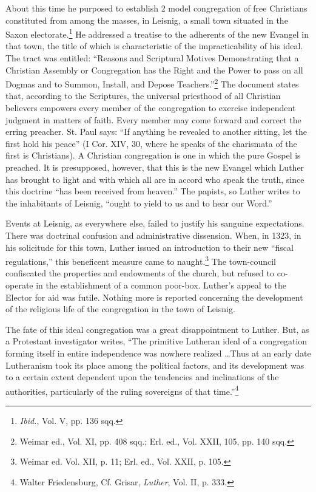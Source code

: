 About this time he purposed to establish 2 model congregation of free
Christians constituted from among the masses, in Leisnig, a small town situated
in the Saxon electorate.\footnote{\textit{Ibid.}, Vol. V, pp. 136 sqq.}
He addressed a treatise to the adherents of
the new Evangel in that town, the title of which is characteristic of the
impracticability of his ideal. The tract was entitled: “Reasons and Scriptural
Motives Demonstrating that a Christian Assembly or Congregation has the
Right and the Power to pass on all Dogmas and to Summon, Install, and
Depose Teachers.”\footnote{Weimar ed., Vol. XI, pp. 408 sqq.; Erl. ed., Vol. XXII, 105, pp. 140 sqq.}
The document states that, according to the Scriptures,
the universal priesthood of all Christian believers empowers every member
of the congregation to exercise independent judgment in matters of faith.
Every member may come forward and correct the erring preacher. St. Paul
says: “If anything be revealed to another sitting, let the first hold his
peace” (I Cor. XIV, 30, where he speaks of the charismata of the first is
Christians). A Christian congregation is one in which the pure Gospel is
preached. It is presupposed, however, that this is the new Evangel which
Luther has brought to light and with which all are in accord who
speak the truth, since this doctrine ``has been received from heaven.''
The papists, so Luther writes to the inhabitants of Leisnig, ``ought to
yield to us and to hear our Word.''

Events at Leisnig, as everywhere else,
failed to justify his sanguine expectations. There was doctrinal confusion
and administrative dissension. When, in 1323, in his solicitude for this
town, Luther issued an introduction to their new ``fiscal regulations,''
this beneficent measure came to naught.\footnote{Weimar ed. Vol. XII, p. 11; Erl. ed., Vol. XXII, p. 105.}
The town-council confiscated the properties and endowments of the church,
but refused to co-operate in the establishment of a common poor-box.
Luther’s appeal to the Elector for aid was futile. Nothing more is reported
concerning the development of the religious life of the congregation in the
town of Leisnig.

The fate of this ideal congregation was a great disappointment to
Luther. But, as a Protestant investigator writes, “The primitive
Lutheran ideal of a congregation forming itself in entire independence
was nowhere realized \dots Thus at an early date Lutheranism took
its place among the political factors, and its development was to a
certain extent dependent upon the tendencies and inclinations of the
authorities, particularly of the ruling sovereigns of that time.”\footnote
{Walter Friedensburg, Cf. Grisar, \textit{Luther}, Vol. II, p. 333.}

